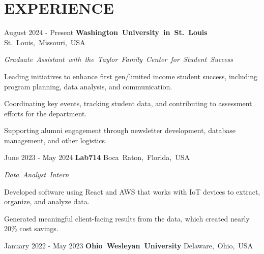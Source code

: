 \documentclass[10pt, letterpaper]{article}
\begin{document}
\section{EXPERIENCE}

\begin{twocolentry}{August 2024 - Present}
    \mbox{\textbf{Washington University in St. Louis}}
    \kern {}
    \AND
    \kern {}
    \mbox{St. Louis, Missouri, USA}
\end{twocolentry}

\vspace{\highlightSpacing}
\mbox{\textit{Graduate Assistant with the Taylor Family Center for Student Success}}
\begin{onecolentry}
    \begin{highlights}
        \item Leading initiatives to enhance first gen/limited income student success, including program planning, data analysis, and communication.
        \item Coordinating key events, tracking student data, and contributing to assessment efforts for the department.
        \item Supporting alumni engagement through newsletter development, database management, and other logistics.
    \end{highlights}
\end{onecolentry}

\vspace{\entrySpacing}\begin{twocolentry}{June 2023 - May 2024}
    \mbox{\textbf{Lab714}}
    \kern {}
    \AND
    \kern {}
    \mbox{Boca Raton, Florida, USA}
\end{twocolentry}

\vspace{\highlightSpacing}
\mbox{\textit{Data Analyst Intern}}
\begin{onecolentry}
    \begin{highlights}
        \item Developed software using React and AWS that works with IoT devices to extract, organize, and analyze data.
        \item Generated meaningful client-facing results from the data, which created nearly 20\% cost savings.
    \end{highlights}
\end{onecolentry}

\vspace{\entrySpacing}\begin{twocolentry}{January 2022 - May 2023}
    \mbox{\textbf{Ohio Wesleyan University}}
    \kern {}
    \AND
    \kern {}
    \mbox{Delaware, Ohio, USA}
\end{twocolentry}
\end{document}
